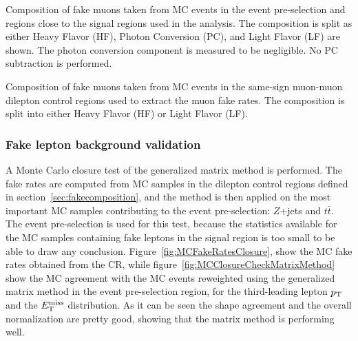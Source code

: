\begin{table}[ht!]
\centering

\caption{
Composition of fake muons taken from  MC events in the event pre-selection and regions close to the signal regions used in the analysis. 
The composition is split as either Heavy Flavor (HF), Photon
Conversion (PC), and Light Flavor (LF) are shown. The photon conversion component
is measured to be negligible. No PC subtraction is performed.
}
\label{table:CompositionMuonCR}
\end{table}

\begin{table}[ht!]
\centering

\caption{
Composition of fake muons taken from  MC events in the same-sign muon-muon dilepton control regions
used to extract the muon fake rates. The composition is split into either Heavy Flavor (HF) or Light Flavor (LF). 
}
\label{table:CompositionMuonSR}
\end{table}

\clearpage
\subsubsection{Fake lepton background validation}

A Monte Carlo closure test of the generalized matrix method is performed. The fake rates are computed from MC samples in the dilepton control regions defined in section~\ref{sec:fakecomposition}, and the method is then applied on the most important MC samples contributing to the event pre-selection: $Z$+jets and $t\bar{t}$. The event pre-selection is used for this test, because the statistics available for the MC samples containing fake leptons in the signal region is too small to be able to draw any conclusion. Figure~\ref{fig:MCFakeRatesClosure}, show the MC fake rates obtained from the CR, while figure~\ref{fig:MCClosureCheckMatrixMethod} show the MC agreement with the MC events reweighted using the generalized matrix method in the event pre-selection region, for the third-leading lepton $p_{\mathrm{T}}$ and the $E_{\mathrm{T}}^{\mathrm{miss}}$ distribution. As it can be seen the shape agreement and the overall normalization are pretty good, showing that the matrix method is performing well.


